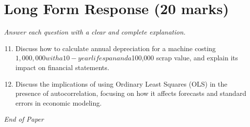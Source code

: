 \documentclass[12pt]{article}
\begin{document}
\section*{Long Form Response (20 marks)}
\textit{Answer each question with a clear and complete explanation.}
\begin{enumerate}[label=\arabic*.]
\setcounter{enumi}{10}
\item Discuss how to calculate annual depreciation for a machine costing $1,000,000 with a 10-year lifespan and a $100,000 scrap value, and explain its impact on financial statements.
\item Discuss the implications of using Ordinary Least Squares (OLS) in the presence of autocorrelation, focusing on how it affects forecasts and standard errors in economic modeling.
\end{enumerate}

\vfill
\noindent\textit{End of Paper}
\end{document}
